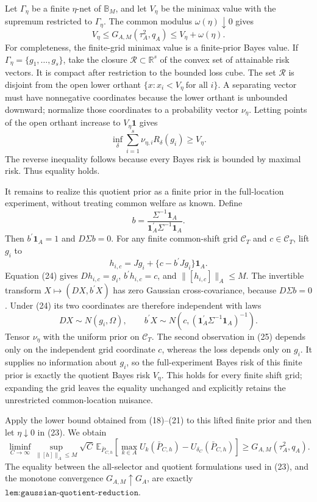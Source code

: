 Let \(\Gamma_\eta\) be a finite \(\eta\)-net of \(\mathbb B_M\), and let \(V_\eta\) be the minimax value with the supremum restricted to \(\Gamma_\eta\).  The common modulus \(\omega(\eta)\downarrow0\) gives
\[
 V_\eta\leq G_{A,M}(\tau_A^2,q_A)
 \leq V_\eta+\omega(\eta).                                      \tag{23}
\]
For completeness, the finite-grid minimax value is a finite-prior Bayes value.  If \(\Gamma_\eta=\{g_1,\ldots,g_s\}\), take the closure \(\mathscr R\subset\mathbb R^s\) of the convex set of attainable risk vectors.  It is compact after restriction to the bounded loss cube.  The set \(\mathscr R\) is disjoint from the open lower orthant \(\{x:x_i<V_\eta\ \text{for all }i\}\).  A separating vector must have nonnegative coordinates because the lower orthant is unbounded downward; normalize those coordinates to a probability vector \(\nu_\eta\).  Letting points of the open orthant increase to \(V_\eta\mathbf 1\) gives
\[
 \inf_\delta\sum_{i=1}^s\nu_{\eta,i}R_\delta(g_i)\geq V_\eta.
\]
The reverse inequality follows because every Bayes risk is bounded by maximal risk.  Thus equality holds.

It remains to realize this quotient prior as a finite prior in the full-location experiment, without treating common welfare as known.  Define
\[
 b=\frac{\Sigma^{-1}\mathbf 1_A}{\mathbf 1_A^{\prime}\Sigma^{-1}\mathbf 1_A}.
\]
Then \(b^{\prime}\mathbf 1_A=1\) and \(D\Sigma b=0\).  For any finite common-shift grid \(\mathcal C_T\) and \(c\in\mathcal C_T\), lift \(g_i\) to
\[
 h_{i,c}=Jg_i+\{c-b^{\prime}Jg_i\}\mathbf 1_A.                    \tag{24}
\]
Equation (24) gives \(Dh_{i,c}=g_i\), \(b^{\prime}h_{i,c}=c\), and \(\lVert[h_{i,c}]\rVert_A\leq M\).  The invertible transform \(X\mapsto(DX,b^{\prime}X)\) has zero Gaussian cross-covariance, because \(D\Sigma b=0\).  Under (24) its two coordinates are therefore independent with laws
\[
 DX\sim N(g_i,\Omega),
 \qquad b^{\prime}X\sim N\!\left(c,(\mathbf 1_A^{\prime}\Sigma^{-1}\mathbf 1_A)^{-1}\right). \tag{25}
\]
Tensor \(\nu_\eta\) with the uniform prior on \(\mathcal C_T\).  The second observation in (25) depends only on the independent grid coordinate \(c\), whereas the loss depends only on \(g_i\).  It supplies no information about \(g_i\), so the full-experiment Bayes risk of this finite prior is exactly the quotient Bayes risk \(V_\eta\).  This holds for every finite shift grid; expanding the grid leaves the equality unchanged and explicitly retains the unrestricted common-location nuisance.

Apply the lower bound obtained from (18)--(21) to this lifted finite prior and then let \(\eta\downarrow0\) in (23).  We obtain
\[
 \liminf_{C\to\infty}\sup_{\lVert[h]\rVert_A\leq M}
 \sqrt C\,\mathbb E_{\bar P_{C,h}}
 \left[\max_{k\in A}U_k(\bar P_{C,h})-U_{\delta_C}(\bar P_{C,h})\right]
 \geq G_{A,M}(\tau_A^2,q_A).                                     \tag{26}
\]
The equality between the all-selector and quotient formulations used in (23), and the monotone convergence \(G_{A,M}\uparrow G_A\), are exactly \(\texttt{lem:gaussian-quotient-reduction}\).

